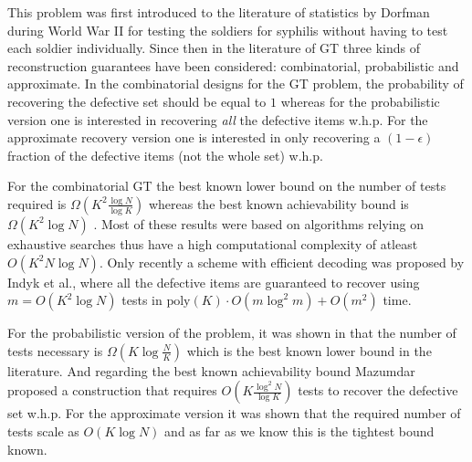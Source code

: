 \documentclass[conference,twocolumn]{IEEEtran}
\begin{document}
This problem was first introduced to the literature of statistics by Dorfman \cite{dorfman1943detection} during World War II for testing the soldiers for syphilis without having to test each soldier individually. 
Since then in the literature of GT three kinds of reconstruction guarantees have been considered: combinatorial, probabilistic and approximate. In the combinatorial designs for the GT problem, the probability of recovering the defective set should be equal to $1$ whereas for the probabilistic version one is interested in recovering \textit{all} the defective items w.h.p.
For the approximate recovery version one is interested in only recovering a $(1-\epsilon)$ fraction of the defective items (not the whole set) w.h.p. %

For the combinatorial GT the best known lower bound on the number of tests required is $\Omega(K^2\frac{\log N}{\log K})$ \cite{d1982bounds,erdos1985families} whereas the best known achievability bound is $\Omega(K^2 \log N)$ \cite{kautz1964nonrandom,porat2011explicit}. Most of these results were based on algorithms relying on exhaustive searches thus have a high computational complexity of atleast $O(K^2 N\log N)$. Only recently a scheme with efficient decoding was proposed by Indyk et al., \cite{indyk2010efficiently} where all the defective items are guaranteed to recover using $m=O(K^2\log N)$ tests in $\text{poly}(K)\cdot O(m \log^2 m )+O(m^2)$ time. 

For the probabilistic version of the problem, it was shown in \cite{chan2014non,atia2012boolean} that the number of tests necessary is $\Omega(K\log \frac{N}{K})$ which is the best known lower bound in the literature. And regarding the best known achievability bound Mazumdar \cite{mazumdar2015nonadaptive} proposed a construction that requires $O(K\frac{\log^2 N}{\log K})$ tests to recover the defective set w.h.p. For the approximate version it was shown \cite{atia2012boolean} that the required number of tests scale as $O(K\log N)$ and as far as we know this is the tightest bound known.
\end{document}
